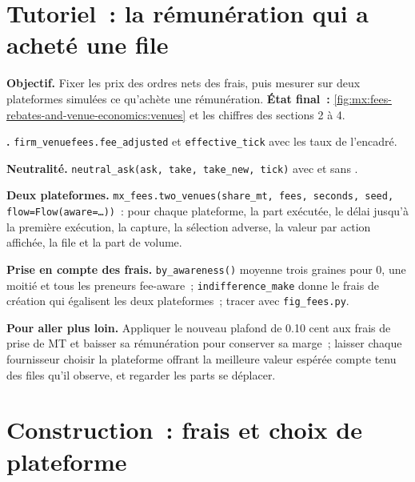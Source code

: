\section{Tutoriel~: la rémunération qui a acheté une file}\label{tut:mx:fees-rebates-and-venue-economics:tut}

\begin{tutorial}
\textbf{Objectif.} Fixer les prix des ordres nets des frais, puis mesurer sur deux plateformes simulées ce qu'achète une rémunération.
\textbf{État final~:} \cref{fig:mx:fees-rebates-and-venue-economics:venues} et les chiffres des sections 2 à 4.
\begin{tutsteps}
\item \textbf{.} \texttt{firm\_venuefees.fee\_adjusted} et \texttt{effective\_tick} avec les taux de l'encadré.
\item \textbf{Neutralité.} \texttt{neutral\_ask(ask, take, take\_new, tick)} avec et sans .
\item \textbf{Deux plateformes.} \texttt{mx\_fees.two\_venues(share\_mt, fees, seconds, seed, flow=Flow(aware=\dots))}~: pour chaque plateforme, la part exécutée, le délai jusqu'à la
première exécution, la capture, la sélection adverse, la valeur par action affichée, la file et la part de volume.
\item \textbf{Prise en compte des frais.} \texttt{by\_awareness()} moyenne trois graines pour 0, une moitié et tous les preneurs fee-aware~; \texttt{indifference\_make} donne le
frais de création qui égalisent les deux plateformes~; tracer avec \texttt{fig\_fees.py}.
\end{tutsteps}
\textbf{Pour aller plus loin.} Appliquer le nouveau plafond de 0.10 cent aux frais de prise de MT et baisser sa rémunération pour conserver sa marge~; laisser chaque fournisseur choisir la plateforme
offrant la meilleure valeur espérée compte tenu des files qu'il observe, et regarder les parts se déplacer.
\end{tutorial}

\section{Construction~: frais et choix de plateforme}\label{bld:mx:fees-rebates-and-venue-economics:venuefees}

